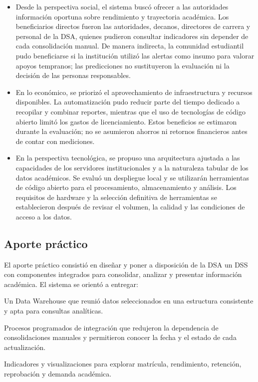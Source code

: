 \documentclass[11pt,oneside,openany]{book}
\begin{document}
\begin{itemize}[leftmargin=*]
\item Desde la perspectiva social, el sistema buscó ofrecer a las autoridades información oportuna sobre rendimiento y trayectoria académica. Los beneficiarios directos fueron las autoridades, decanos, directores de carrera y personal de la DSA, quienes pudieron consultar indicadores sin depender de cada consolidación manual. De manera indirecta, la comunidad estudiantil pudo beneficiarse si la institución utilizó las alertas como insumo para valorar apoyos tempranos; las predicciones no sustituyeron la evaluación ni la decisión de las personas responsables.
\item En lo económico, se priorizó el aprovechamiento de infraestructura y recursos disponibles. La automatización pudo reducir parte del tiempo dedicado a recopilar y combinar reportes, mientras que el uso de tecnologías de código abierto limitó los gastos de licenciamiento. Estos beneficios se estimaron durante la evaluación; no se asumieron ahorros ni retornos financieros antes de contar con mediciones.
\item En la perspectiva tecnológica, se propuso una arquitectura ajustada a las capacidades de los servidores institucionales y a la naturaleza tabular de los datos académicos. Se evaluó un despliegue local y se utilizarán herramientas de código abierto para el procesamiento, almacenamiento y análisis. Los requisitos de hardware y la selección definitiva de herramientas se establecieron después de revisar el volumen, la calidad y las condiciones de acceso a los datos.
\end{itemize}
\subsection*{Aporte práctico}

El aporte práctico consistió en diseñar y poner a disposición de la DSA un DSS con componentes integrados para consolidar, analizar y presentar información académica. El sistema se orientó a entregar:

Un Data Warehouse que reunió datos seleccionados en una estructura consistente y apta para consultas analíticas.

Procesos programados de integración que redujeron la dependencia de consolidaciones manuales y permitieron conocer la fecha y el estado de cada actualización.

Indicadores y visualizaciones para explorar matrícula, rendimiento, retención, reprobación y demanda académica.
\end{document}
